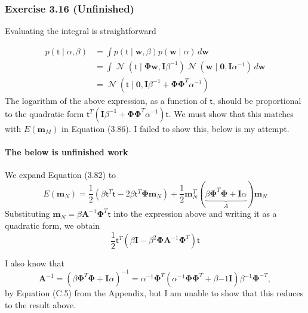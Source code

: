 \documentclass[12pt, a4paper]{article}
\newcommand{\vect}[1]{\bm{#1}}
\DeclareMathOperator{\N}{\mathcal{N}}
\begin{document}
\subsubsection*{Exercise 3.16 (Unfinished)}
Evaluating the integral is straightforward

\begin{align*}
	p(\mathsf{t} \mid  \alpha, \beta)
	&=
	\int
	p(\mathsf{t} \mid \vect{w}, \beta) p(\vect{w} \mid \alpha)
	\, d \vect{w} \\
	&=
	\int
	\N \left( \mathsf{t} \mid \vect{\Phi} \vect{w}, \vect{I}\beta^{-1} \right)
	\N \left( \vect{w} \mid \vect{0}, \vect{I}\alpha^{-1} \right)
	\, d \vect{w} \tag{definitions} \\
	&= \N \left( \mathsf{t} \mid \vect{0}, \vect{I}\beta^{-1}
	+ \vect{\Phi} \vect{\Phi}^T \alpha^{-1} \right) \tag{using Eqn (2.115)}
\end{align*}
The logarithm of the above expression, as a function of $\mathsf{t}$, should be proportional to the quadratic form $\mathsf{t}^T \left(\vect{I}\beta^{-1}
+ \vect{\Phi} \vect{\Phi}^T \alpha^{-1}  \right) \mathsf{t}$.
We must show that this matches with $E(\vect{m}_M)$ in Equation (3.86).
I failed to show this, below is my attempt.


\paragraph{The below is unfinished work}
We expand Equation (3.82) to
\begin{equation*}
	E(\vect{m}_N)
	=
	\frac{1}{2}
	\left( \beta \mathsf{t}^T \mathsf{t}
	- 2 \beta \mathsf{t}^T \vect{\Phi}\vect{m}_N  \right)
	+
	\frac{1}{2}
	\vect{m}_N^T
	\left( 
	\underbrace{\beta \vect{\Phi}^T \vect{\Phi} + \vect{I} \alpha}_{A}
	 \right)
	\vect{m}_N
\end{equation*}
Substituting $\vect{m}_N = \beta \vect{A}^{-1} \vect{\Phi}^T \mathsf{t}$ into the expression above and writing it as a quadratic form, we obtain
\begin{equation*}
	\frac{1}{2} \mathsf{t}^T
	\left( \beta \vect{I} - \beta^2 \vect{\Phi} \vect{A}^{-1} \vect{\Phi}^T  \right)
	\mathsf{t}
\end{equation*}

I also know that
\begin{equation*}
	\vect{A}^{-1} = \left( \beta \vect{\Phi}^T \vect{\Phi} + \vect{I} \alpha \right)^{-1} = 
	\alpha^{-1} \vect{\Phi}^T
	\left( \alpha^{-1} \vect{\Phi} \vect{\Phi}^T +\beta{-1}\vect{I} \right)
	\beta^{-1} \vect{\Phi}^{-T},
\end{equation*}
by Equation (C.5) from the Appendix, but I am unable to show that this reduces to the result above.
\end{document}

